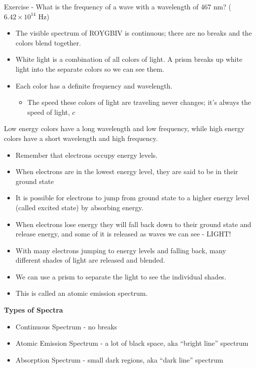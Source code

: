 \documentclass[../hchem.tex]{subfiles}
\begin{document}
Exercise - What is the frequency of a wave with a wavelength of 467 nm? ($6.42\times10^{14}$ Hz)

\begin{itemize}
    \item The visible spectrum of ROYGBIV is continuous; there are no breaks and the colors blend together.
    \item White light is a combination of all colors of light. A prism breaks up white light into the separate colors so we can see them.
    \item Each color has a definite frequency and wavelength. 
    \begin{itemize}
        \item The speed these colors of light are traveling never changes; it's always the speed of light, $c$
    \end{itemize}
\end{itemize}

Low energy colors have a long wavelength and low frequency, while high energy colors have a short wavelength and high frequency.

\begin{itemize}
    \item Remember that electrons occupy energy levels.
    \item When electrons are in the lowest energy level, they are said to be in their ground state 
    \item It is possible for electrons to jump from ground state to a higher energy level (called excited state) by absorbing energy.
    \item When electrons lose energy they will fall back down to their ground state and release energy, and some of it is released as waves we can see - LIGHT!
    
    \item With many electrons jumping to energy levels and falling back, many different shades of light are released and blended. 
    \item We can use a prism to separate the light to see the individual shades.
    \item This is called an atomic emission spectrum.
\end{itemize}

\textbf{Types of Spectra}
\begin{itemize}
    \item Continuous Spectrum - no breaks 
    \item Atomic Emission Spectrum - a lot of black space, aka ``bright line'' spectrum 
    \item Absorption Spectrum - small dark regions, aka ``dark line'' spectrum 
\end{itemize}
\end{document}
